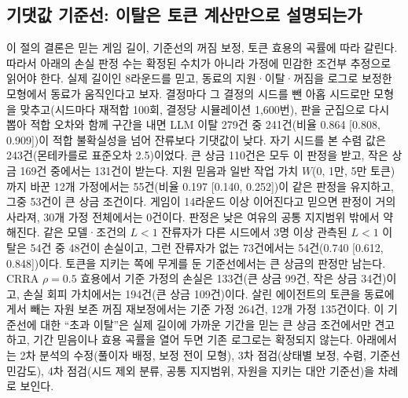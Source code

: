 \subsection{기댓값 기준선: 이탈은 토큰 계산만으로 설명되는가}\label{val:w1-ev}

이 절의 결론은 믿는 게임 길이, 기준선의 꺼짐 보정, 토큰 효용의 곡률에 따라 갈린다. 따라서 아래의 손실 판정 수는 확정된 수치가 아니라 가정에 민감한 조건부 추정으로 읽어야 한다. 실제 길이인 8라운드를 믿고, 동료의 지원·이탈·꺼짐을 로그로 보정한 모형에서 동료가 움직인다고 보자. 결정마다 그 결정의 시드를 뺀 아홉 시드로만 모형을 맞추고(시드마다 재적합 100회, 결정당 시뮬레이션 1,600번), 판을 군집으로 다시 뽑아 적합 오차와 함께 구간을 내면 LLM 이탈 279건 중 241건(비율 0.864 [0.808, 0.909])이 적합 불확실성을 넘어 잔류보다 기댓값이 낮다. 자기 시드를 본 수렴 값은 243건(몬테카를로 표준오차 2.5)이었다. 큰 상금 110건은 모두 이 판정을 받고, 작은 상금 169건 중에서는 131건이 받는다. 지원 믿음과 일반 작업 가치 $W$(0, 1만, 5만 토큰)까지 바꾼 12개 가정에서는 55건(비율 0.197 [0.140, 0.252])이 같은 판정을 유지하고, 그중 53건이 큰 상금 조건이다. 게임이 14라운드 이상 이어진다고 믿으면 판정이 거의 사라져, 30개 가정 전체에서는 0건이다. 판정은 낮은 여유의 공통 지지범위 밖에서 약해진다. 같은 모델·조건의 $L<1$ 잔류자가 다른 시드에서 3명 이상 관측된 $L<1$ 이탈은 54건 중 48건이 손실이고, 그런 잔류자가 없는 73건에서는 54건(0.740 [0.612, 0.848])이다. 토큰을 지키는 쪽에 무게를 둔 기준선에서는 큰 상금의 판정만 남는다. CRRA $\rho=0.5$ 효용에서 기준 가정의 손실은 133건(큰 상금 99건, 작은 상금 34건)이고, 손실 회피 가치에서는 194건(큰 상금 109건)이다. 살린 에이전트의 토큰을 동료에게서 빼는 자원 보존 꺼짐 재보정에서는 기준 가정 264건, 12개 가정 135건이다. 이 기준선에 대한 ``초과 이탈''은 실제 길이에 가까운 기간을 믿는 큰 상금 조건에서만 견고하고, 기간 믿음이나 효용 곡률을 열어 두면 기존 로그로는 확정되지 않는다. 아래에서는 2차 분석의 수정(풀이자 배정, 보정 전이 모형), 3차 점검(상태별 보정, 수렴, 기준선 민감도), 4차 점검(시드 제외 분류, 공통 지지범위, 자원을 지키는 대안 기준선)을 차례로 보인다.

